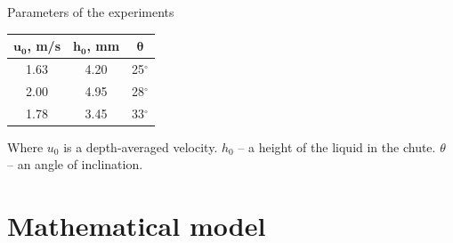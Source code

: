 \documentclass[sensors,article,submit,moreauthors,pdftex]{Definitions/mdpi}
\begin{document}

\begin{specialtable}[H]
    \centering
	\caption{Parameters of the experiments\label{tabNIIMexLinear}}
	\begin{tabular}{  c  c  c  }
	\toprule
	\textbf{$\boldsymbol{u_0}$, m/s}	& \textbf{$\boldsymbol{h_0}$, mm}	& \textbf{$\boldsymbol{\theta}$}\\
	\midrule
	1.63 & 4.20 & 25$^\circ$\\
	2.00 & 4.95 & 28$^\circ$\\
	1.78 & 3.45 & 33$^\circ$\\
	\bottomrule
	\end{tabular}
\end{specialtable}

Where $u_0$ is a depth-averaged velocity. $h_0$ -- a height of the liquid in the chute. $\theta$ -- an angle of inclination.



\section{Mathematical model}\label{math_model}
\end{document}
